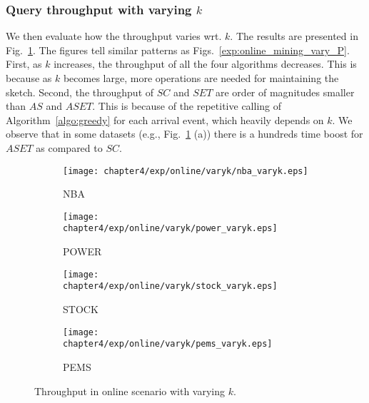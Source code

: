 \subsubsection{Query throughput with varying $k$} 
We then evaluate how the throughput varies wrt. $k$. 
The results are presented in Fig.~\ref{exp:online_mining_vary_k}.
The figures tell similar patterns as
Figs.~\ref{exp:online_mining_vary_P}.
First, as $k$ increases, the throughput of all the four algorithms decreases.
This is because as $k$ becomes large, more operations are needed for maintaining the sketch.
Second, the throughput of $SC$ and $SET$ are order of magnitudes smaller than $AS$ and $ASET$.
This is because of the repetitive calling of Algorithm~\ref{algo:greedy} for each arrival event,
which heavily depends on $k$. We observe that in some datasets (e.g., Fig.~\ref{exp:online_mining_vary_k} (a)) there is a hundreds time boost for $ASET$ as compared to $SC$.

\begin{figure}[t]
\centering
    \begin{subfigure}[b]{0.45\textwidth}
        \texttt{[image: chapter4/exp/online/varyk/nba\_varyk.eps]}
        \caption{NBA}
    \end{subfigure}
    \begin{subfigure}[b]{0.45\textwidth}
        \texttt{[image: chapter4/exp/online/varyk/power\_varyk.eps]}
        \caption{POWER}
    \end{subfigure}
    \begin{subfigure}[b]{0.45\textwidth}
        \texttt{[image: chapter4/exp/online/varyk/stock\_varyk.eps]}
        \caption{STOCK}
    \end{subfigure}
    \begin{subfigure}[b]{0.45\textwidth}
        \texttt{[image: chapter4/exp/online/varyk/pems\_varyk.eps]}
        \caption{PEMS}
    \end{subfigure}
\caption{Throughput in online scenario with varying $k$.}
\label{exp:online_mining_vary_k}
\end{figure}

